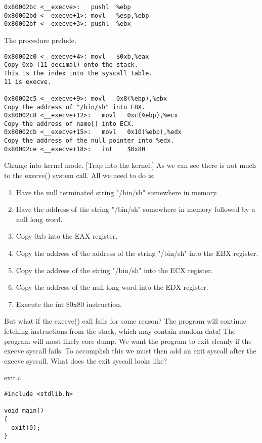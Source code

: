 \documentclass[10pt]{article}
\begin{document}
{\begin{verbatim}
0x80002bc <__execve>:   pushl  %ebp
0x80002bd <__execve+1>: movl   %esp,%ebp
0x80002bf <__execve+3>: pushl  %ebx
\end{verbatim}
The procedure prelude. 
\begin{verbatim}
0x80002c0 <__execve+4>: movl   $0xb,%eax
Copy 0xb (11 decimal) onto the stack. 
This is the index into the syscall table. 
11 is execve. 

0x80002c5 <__execve+9>: movl   0x8(%ebp),%ebx
Copy the address of "/bin/sh" into EBX. 
0x80002c8 <__execve+12>:   movl   0xc(%ebp),%ecx
Copy the address of name[] into ECX. 
0x80002cb <__execve+15>:   movl   0x10(%ebp),%edx
Copy the address of the null pointer into %edx. 
0x80002ce <__execve+18>:   int    $0x80
\end{verbatim}
Change into kernel mode. [Trap into the kernel.] 
As we can see there is not much to the execve() system call. All we need to do is: 
\begin{enumerate}
\item Have the null terminated string "/bin/sh" somewhere in memory. 
\item Have the address of the string "/bin/sh" somewhere in memory followed by a null long word. 
\item Copy 0xb into the EAX register. 
\item Copy the address of the address of the string "/bin/sh" into the EBX register. 
\item Copy the address of the string "/bin/sh" into the ECX register. 
\item Copy the address of the null long word into the EDX register. 
\item Execute the int \$0x80 instruction. 
\end{enumerate}


But what if the execve() call fails for some reason? The program will continue fetching instructions from the 
stack, which may contain random data! The program will most likely core dump. We want the program to exit 
cleanly if the execve syscall fails. To accomplish this we must then add an exit syscall after the execve syscall. 
What does  the exit syscall looks like?

exit.c

\begin{lstlisting}
#include <stdlib.h>

void main() 
{
  exit(0);
}
\end{lstlisting}

}
\end{document}

